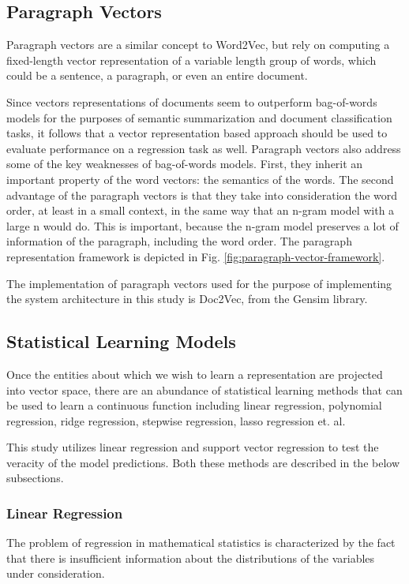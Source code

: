 \documentclass[conference]{IEEEtran}
\begin{document}
    \subsection{Paragraph Vectors}
        Paragraph vectors are a similar concept to Word2Vec, but rely on computing a fixed-length vector representation of a variable length group of words, which could be a sentence, a paragraph, or even an entire document.

        Since vectors representations of documents seem to outperform bag-of-words models for the purposes of semantic summarization and document classification tasks, it follows that a vector representation based approach should be used to evaluate performance on a regression task as well. Paragraph vectors also address some of the key weaknesses of bag-of-words models. First, they inherit an important property of the word vectors: the semantics of the words. The second advantage of the paragraph vectors is that they take into consideration the word order, at least in a small context, in the same way that an n-gram model with a large n would do. This is important, because the n-gram model preserves a lot of information of the paragraph, including the word order\cite{le2014distributed}. The paragraph representation framework is depicted in Fig. \ref{fig:paragraph-vector-framework}.

        The implementation of paragraph vectors used for the purpose of implementing the system architecture in this study is Doc2Vec, from the Gensim library\cite{doc2vec_api}.


    \subsection{Statistical Learning Models}
        Once the entities about which we wish to learn a representation are projected into vector space, there are an abundance of statistical learning methods that can be used to learn a continuous function including linear regression, polynomial regression, ridge regression, stepwise regression, lasso regression et. al.

        This study utilizes linear regression and support vector regression to test the veracity of the model predictions. Both these methods are described in the below subsections.

    \subsubsection{Linear Regression}
        The problem of regression in mathematical statistics is characterized by the fact that there is insufficient information about the distributions of the variables under consideration\cite{regression_analysis}.
\end{document}
